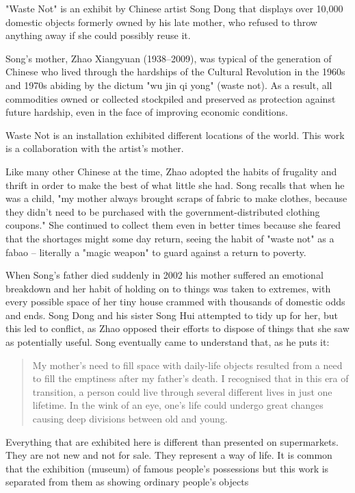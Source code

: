 "Waste Not" is an exhibit by Chinese artist Song Dong that displays over 10,000 domestic objects formerly owned by his late mother, who refused to throw anything away if she could possibly reuse it. 

Song’s mother, Zhao Xiangyuan (1938–2009), was typical of the generation of Chinese who lived through the hardships of the Cultural Revolution in the 1960s and 1970s abiding by the dictum "wu jin qi yong" (waste not). As a result, all commodities owned or collected stockpiled and preserved as protection against future hardship, even in the face of improving economic conditions.

Waste Not is an installation exhibited different locations of the world. This work is a collaboration with the artist’s mother.

Like many other Chinese at the time, Zhao adopted the habits of frugality and thrift in order to make the best of what little she had. Song recalls that when he was a child, "my mother always brought scraps of fabric to make clothes, because they didn't need to be purchased with the government-distributed clothing coupons." She continued to collect them even in better times because she feared that the shortages might some day return, seeing the habit of "waste not" as a fabao – literally a "magic weapon" to guard against a return to poverty.

When Song's father died suddenly in 2002 his mother suffered an emotional breakdown and her habit of holding on to things was taken to extremes, with every possible space of her tiny house crammed with thousands of domestic odds and ends. Song Dong and his sister Song Hui attempted to tidy up for her, but this led to conflict, as Zhao opposed their efforts to dispose of things that she saw as potentially useful. Song eventually came to understand that, as he puts it:

\begin{quote}
My mother's need to fill space with daily-life objects resulted from a need to fill the emptiness after my father's death. I recognised that in this era of transition, a person could live through several different lives in just one lifetime. In the wink of an eye, one's life could undergo great changes causing deep divisions between old and young.
\end{quote}

Everything that are exhibited here is different than presented on supermarkets. They are not new and not for sale. They represent a way of life. It is common that the exhibition (museum) of famous people's possessions but this work is separated from them as showing ordinary people's objects

